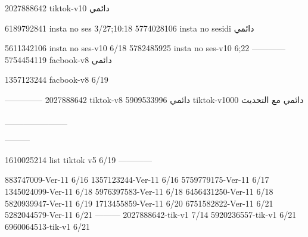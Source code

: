 2027888642 tiktok-v10
دائمي

6189792841 insta no ses
3/27;10:18
5774028106 insta no sesidi
دائمي

5611342106 insta no ses-v10
6/18
5782485925 insta no ses-v10
6;22
------------
5754454119 facbook-v8
دائمي

1357123244 facbook-v8
6/19

--------------
2027888642 tiktok-v8
دائمي
5909533996 tiktok-v1000
دائمي مع التحديث

__________

---------

1610025214 list tiktok v5
6/19
------------

883747009-Ver-11
6/16
1357123244-Ver-11
6/16
5759779175-Ver-11
6/17
1345024099-Ver-11
6/18
5976397583-Ver-11
6/18
6456431250-Ver-11
6/18
5820939947-Ver-11
6/19
1713455859-Ver-11
6/20
6751582822-Ver-11
6/21
5282044579-Ver-11
6/21
---------
2027888642-tik-v1
7/14
5920236557-tik-v1
6/21
6960064513-tik-v1
6/21

